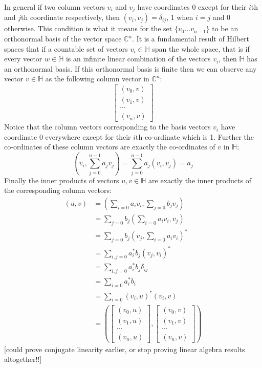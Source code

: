 In general if two column vectors $v_i$ and $v_j$ have coordinates 0 except for their $i$th and $j$th coordinate respectively, then $(v_i, v_j) = \delta_{ij}$, 1 when $i = j$ and 0 otherwise. This condition is what it means for the set $\{v_0 \dots v_{n-1}\}$ to be an orthonormal basis of the vector space $\mathbb{C}^n$. It is a fundamental result of Hilbert spaces that if a countable set of vectors $v_i \in \mathbb{H}$ span the whole space, that is if every vector $w \in \mathbb{H}$ is an infinite linear combination of the vectors $v_i$, then $\mathbb{H}$ has an orthonormal basis. If this orthonormal basis is finite then we can observe any vector $v \in \mathbb{H}$ as the following column vector in $\mathbb{C}^n$:
\[\left[\begin{matrix}
(v_0, v)\\
(v_1, v)\\
\cdots\\
(v_n, v)
\end{matrix}\right]\]
Notice that the column vectors corresponding to the basis vectors $v_i$ have coordinate 0 everywhere except for their $i$th co-ordinate which is 1. Further the co-ordinates of these column vectors are exactly the co-ordinates of $v$ in $\mathbb{H}$:
\[\left(v_i, \sum_{j=0}^{n-1} a_jv_j\right) = \sum_{j=0}^{n-1} a_j\left(v_i, v_j\right) = a_j\]
Finally the inner products of vectors $u, v \in \mathbb{H}$ are exactly the inner products of the corresponding column vectors:
\begin{align*}
(u, v) &= \left(\sum_{i=0}a_iv_i, \sum_{j=0} b_jv_j\right)
\\&= \sum_{j=0}b_j \left(\sum_{i=0}a_iv_i, v_j\right)
\\&= \sum_{j=0}b_j \left(v_j, \sum_{i=0}a_iv_i\right)^*
\\&= \sum_{i,j=0}a_i^*b_j \left(v_j, v_i\right)^*
\\&= \sum_{i,j=0}a_i^*b_j \delta_{ij}
\\&= \sum_{i=0}a_i^*b_i
\\&= \sum_{i=0}(v_i, u)^*(v_i, v)
\\&= \left(
\left[\begin{matrix}
	(v_0, u)\\
	(v_1, u)\\
	\cdots\\
	(v_n, u)
\end{matrix}\right]
,
\left[\begin{matrix}
	(v_0, v)\\
	(v_1, v)\\
	\cdots\\
	(v_n, v)
\end{matrix}\right]
\right)
\end{align*}
[could prove conjugate linearity earlier, or stop proving linear algebra results altogether!!]


